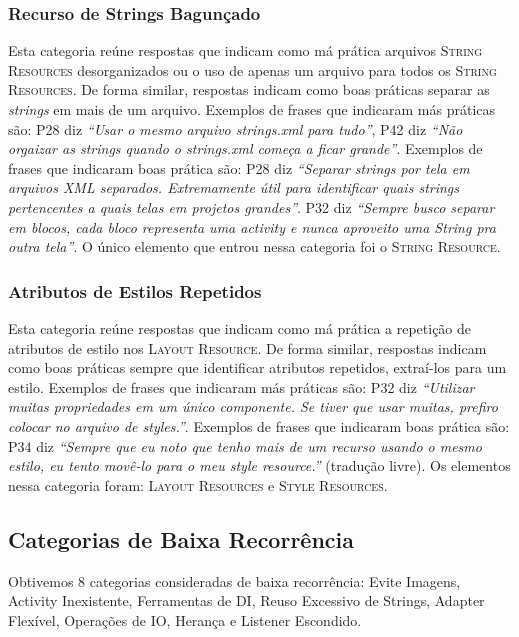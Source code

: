 \subsubsection{Recurso de Strings Bagun\c{c}ado}
Esta categoria re\'une respostas que indicam como m\'a pr\'atica arquivos \textsc{String Resources} desorganizados ou o uso de apenas um arquivo para todos os \textsc{String Resources}. De forma similar, respostas indicam como boas pr\'aticas separar as \textit{strings} em mais de um arquivo. Exemplos de frases que indicaram m\'as pr\'aticas s\~ao: P28 diz \textit{``Usar o mesmo arquivo strings.xml para tudo''}, P42 diz \textit{``N\~ao orgaizar as strings quando o strings.xml come\c{c}a a ficar grande''}. Exemplos de frases que indicaram boas pr\'atica s\~ao: P28 diz \textit{``Separar strings por tela em arquivos XML separados. Extremamente \'util para identificar quais strings pertencentes a quais telas em projetos grandes''}. P32 diz \textit{``Sempre busco separar em blocos, cada bloco representa uma activity e nunca aproveito uma String pra outra tela''}. O \'unico elemento que entrou nessa categoria foi o \textsc{String Resource}. 

\subsubsection{Atributos de Estilos Repetidos}
Esta categoria re\'une respostas que indicam como m\'a pr\'atica a repeti\c{c}\~ao de atributos de estilo nos \textsc{Layout Resource}. De forma similar, respostas indicam como boas pr\'aticas sempre que identificar atributos repetidos, extra\'i-los para um estilo. Exemplos de frases que indicaram m\'as pr\'aticas s\~ao: P32 diz \textit{``Utilizar muitas propriedades em um \'unico componente. Se tiver que usar muitas, prefiro colocar no arquivo de styles.''}. Exemplos de frases que indicaram boas pr\'atica s\~ao: P34 diz \textit{``Sempre que eu noto que tenho mais de um recurso usando o mesmo estilo, eu tento mov\^e-lo para o meu \textit{style resource}.''} (tradu\c{c}\~ao livre). Os elementos nessa categoria foram: \textsc{Layout Resources} e \textsc{Style Resources}.


\subsection{Categorias de Baixa Recorr\^encia}
Obtivemos 8 categorias consideradas de baixa recorr\^encia: Evite Imagens, Activity Inexistente, Ferramentas de DI, Reuso Excessivo de Strings, Adapter Flex\'ivel, Opera\c{c}\~oes de IO, Heran\c{c}a e Listener Escondido.


